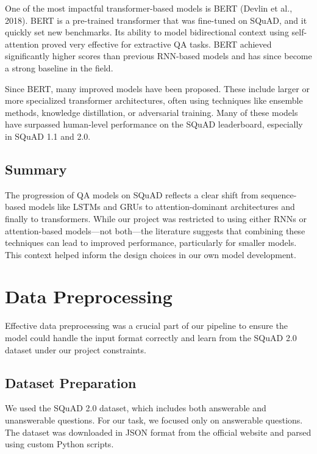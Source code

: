 \documentclass[runningheads]{llncs}
\begin{document}
One of the most impactful transformer-based models is BERT (Devlin et al., 2018). BERT is a pre-trained transformer that was fine-tuned on SQuAD, and it quickly set new benchmarks. Its ability to model bidirectional context using self-attention proved very effective for extractive QA tasks. BERT achieved significantly higher scores than previous RNN-based models and has since become a strong baseline in the field.
    \\
    \par
Since BERT, many improved models have been proposed. These include larger or more specialized transformer architectures, often using techniques like ensemble methods, knowledge distillation, or adversarial training. Many of these models have surpassed human-level performance on the SQuAD leaderboard, especially in SQuAD 1.1 and 2.0.

\subsection{Summary}
The progression of QA models on SQuAD reflects a clear shift from sequence-based models like LSTMs and GRUs to attention-dominant architectures and finally to transformers. While our project was restricted to using either RNNs or attention-based models—not both—the literature suggests that combining these techniques can lead to improved performance, particularly for smaller models. This context helped inform the design choices in our own model development.
	
	

\section{Data Preprocessing}

Effective data preprocessing was a crucial part of our pipeline to ensure the model could handle the input format correctly and learn from the SQuAD 2.0 dataset under our project constraints.

\subsection{Dataset Preparation}

We used the SQuAD 2.0 dataset, which includes both answerable and unanswerable questions. For our task, we focused only on answerable questions. The dataset was downloaded in JSON format from the official website and parsed using custom Python scripts.
\\
\par
\end{document}
